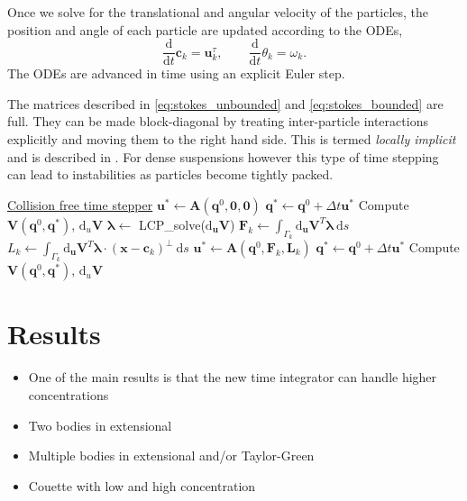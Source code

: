 \documentclass[preprint, 10pt]{elsarticle}
\begin{document}
Once we solve for the translational and angular velocity of the particles, the position and angle of each particle are updated according to the ODEs,
\[ \frac{\text{d}}{\text{d}t}\mathbf{c}_k = \mathbf{u}^\tau_k, \qquad \frac{\text{d}}{\text{d}t}\theta_k =\omega_k.\]
The ODEs are advanced in time using an explicit Euler step. 

The matrices described in \eqref{eq:stokes_unbounded} and \eqref{eq:stokes_bounded} are full. They can be made block-diagonal by treating inter-particle interactions explicitly and moving them to the right hand side. This is termed \textit{locally implicit} and is described in \cite{Lu2017}. For dense suspensions however this type of time stepping can lead to instabilities as particles become tightly packed. 

\begin{algorithm}

  	  \underline{Collision free time stepper}\;
	 $\mathbf{u}^* \gets \mathbf{A}(\mathbf{q}^0,\mathbf{0},\mathbf{0})$\;
	$\mathbf{q}^* \gets \mathbf{q}^0 + \Delta t \mathbf{u}^*$\;
	Compute $\mathbf{V}(\mathbf{q}^0,\mathbf{q}^*)$, $\text{d}_u\mathbf{V}$\;
	{
		$\pmb{\lambda} \gets$ LCP\_solve($\text{d}_{\mathbf{u}}\mathbf{V}$)\;
		$\mathbf{F}_k \gets \int_{\Gamma_k} \text{d}_{\mathbf{u}}\mathbf{V}^T\pmb{\lambda}~\text{d}s$\;
		$L_k \gets \int_{\Gamma_k} \text{d}_{\mathbf{u}}\mathbf{V}^T\pmb{\lambda}\cdot(\mathbf{x}-\mathbf{c}_k)^\perp~\text{d}s$\;
		$\mathbf{u}^* \gets \mathbf{A}(\mathbf{q}^0,\mathbf{F}_k,\mathbf{L}_k)$\;
		$\mathbf{q}^* \gets \mathbf{q}^0 + \Delta t \mathbf{u}^*$\;
		Compute $\mathbf{V}(\mathbf{q}^0,\mathbf{q}^*)$, $\text{d}_u\mathbf{V}$\;
	}
\end{algorithm}

\section{Results\label{s:results}} 

\begin{itemize}
  \item One of the main results is that the new time integrator can
    handle higher concentrations
  \item Two bodies in extensional
  \item Multiple bodies in extensional and/or Taylor-Green
  \item Couette with low and high concentration
\end{itemize}
\end{document}
